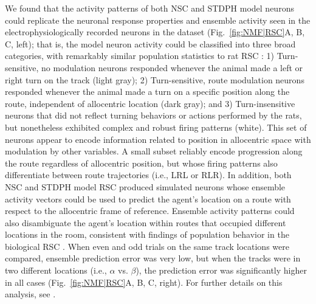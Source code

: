 We found that the activity patterns of both \ac{NSC} and \ac{STDPH} model neurons could replicate the neuronal response properties and ensemble activity seen in the electrophysiologically recorded neurons in the dataset (Fig.~\ref{fig:NMF|RSC}A, B, C, left); that is, the model neuron activity could be classified into three broad categories,
with remarkably similar population statistics to rat \ac{RSC} 
\cite{AlexanderNitz2015}:
1) Turn-sensitive, no modulation neurons responded whenever the animal made a left or right turn
   on the track (light gray);
2) Turn-sensitive, route modulation neurons responded whenever the animal made a turn on a specific position along
   the route, independent of allocentric location (dark gray); and
3) Turn-insensitive neurons that did not reflect turning behaviors or actions performed by the rats,
   but nonetheless exhibited complex and robust firing patterns (white). This set of neurons appear to encode information related to position in allocentric space with modulation by other variables. A small subset reliably encode progression along the route regardless of allocentric position, but whose firing patterns also differentiate between route trajectories (i.e., LRL or RLR). In addition, both \ac{NSC} and \ac{STDPH} model \ac{RSC} produced simulated neurons whose ensemble activity vectors
could be used to predict the agent's location on a route with respect to the allocentric frame of reference. Ensemble activity patterns could also disambiguate the agent's location within routes that occupied different locations in the room, consistent with findings of population behavior in the biological RSC \cite{AlexanderNitz2015}.
When even and odd trials on the same track locations were compared,
ensemble prediction error was very low,
but when the tracks were in two different locations
(i.e., $\alpha$ vs. $\beta$),
the prediction error was significantly higher in all cases
(Fig.~\ref{fig:NMF|RSC}A, B, C, right).
For further details on this analysis, see \cite{AlexanderNitz2015,Rounds2016}.
   
